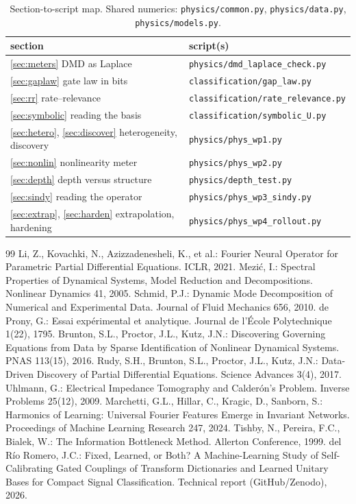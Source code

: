 \documentclass[11pt,a4paper]{article}
\begin{document}
\begin{table}[h]
\centering\small
\begin{tabularx}{\linewidth}{@{}l X@{}}
\toprule
section & script(s) \\
\midrule
\ref{sec:meters} DMD as Laplace & \texttt{physics/dmd\_laplace\_check.py} \\
\ref{sec:gaplaw} gate law in bits & \texttt{classification/gap\_law.py} \\
\ref{sec:rr} rate–relevance & \texttt{classification/rate\_relevance.py} \\
\ref{sec:symbolic} reading the basis & \texttt{classification/symbolic\_U.py} \\
\ref{sec:hetero}, \ref{sec:discover} heterogeneity, discovery & \texttt{physics/phys\_wp1.py} \\
\ref{sec:nonlin} nonlinearity meter & \texttt{physics/phys\_wp2.py} \\
\ref{sec:depth} depth versus structure & \texttt{physics/depth\_test.py} \\
\ref{sec:sindy} reading the operator & \texttt{physics/phys\_wp3\_sindy.py} \\
\ref{sec:extrap}, \ref{sec:harden} extrapolation, hardening & \texttt{physics/phys\_wp4\_rollout.py} \\
\bottomrule
\end{tabularx}
\caption{Section-to-script map. Shared numerics: \texttt{physics/common.py}, \texttt{physics/data.py}, \texttt{physics/models.py}.}
\end{table}

\begin{thebibliography}{99}\small
{} Li, Z., Kovachki, N., Azizzadenesheli, K., et al.: Fourier Neural Operator for Parametric Partial Differential Equations. ICLR, 2021.
 Mezić, I.: Spectral Properties of Dynamical Systems, Model Reduction and Decompositions. Nonlinear Dynamics 41, 2005.
 Schmid, P.J.: Dynamic Mode Decomposition of Numerical and Experimental Data. Journal of Fluid Mechanics 656, 2010.
 de Prony, G.: Essai expérimental et analytique. Journal de l'École Polytechnique 1(22), 1795.
 Brunton, S.L., Proctor, J.L., Kutz, J.N.: Discovering Governing Equations from Data by Sparse Identification of Nonlinear Dynamical Systems. PNAS 113(15), 2016.
 Rudy, S.H., Brunton, S.L., Proctor, J.L., Kutz, J.N.: Data-Driven Discovery of Partial Differential Equations. Science Advances 3(4), 2017.
 Uhlmann, G.: Electrical Impedance Tomography and Calderón's Problem. Inverse Problems 25(12), 2009.
 Marchetti, G.L., Hillar, C., Kragic, D., Sanborn, S.: Harmonics of Learning: Universal Fourier Features Emerge in Invariant Networks. Proceedings of Machine Learning Research 247, 2024.
 Tishby, N., Pereira, F.C., Bialek, W.: The Information Bottleneck Method. Allerton Conference, 1999.
 del Río Romero, J.C.: Fixed, Learned, or Both? A Machine-Learning Study of Self-Calibrating Gated Couplings of Transform Dictionaries and Learned Unitary Bases for Compact Signal Classification. Technical report (GitHub/Zenodo), 2026.
\end{thebibliography}
\end{document}
